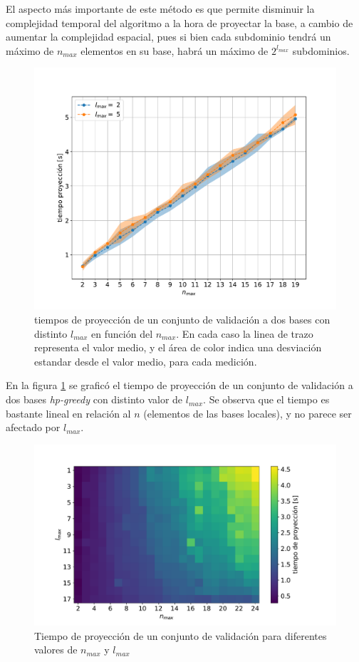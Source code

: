 El aspecto más importante de este método es que permite disminuir la complejidad temporal del algoritmo a la hora de proyectar la base, a cambio de aumentar la complejidad espacial, pues si bien cada subdominio tendrá un máximo de $n_{max}$ elementos en su base, habrá un máximo de $2^{l_{max}}$ subdominios.

\begin{figure}[h!]
\centering
\includegraphics[width=.8\columnwidth ,trim={0, 1cm, 0, 1.2cm}]{figs/t_vs_nmax.pdf}
\caption{tiempos de proyección de un conjunto de validación a dos bases con distinto $l_{max}$ en función del $n_{max}$. En cada caso la linea de trazo representa el valor medio, y el área de color indica una desviación estandar desde el valor medio, para cada medición.}
\label{fig:t_vs_nmax}
\end{figure}


En la figura \ref{fig:t_vs_nmax} se graficó el tiempo de proyección de un conjunto de validación a dos bases \textit{hp-greedy} con distinto valor de $l_{max}$. Se observa que el tiempo es bastante lineal en relación al $n$ (elementos de las bases locales), y no parece ser afectado por $l_{max}$.



\begin{figure}[h!]
\centering
\includegraphics[width=.9\columnwidth, trim={0, 1cm, 0, 1.4cm}]{figs/nmax_lmax_t_grid.pdf}
\caption{Tiempo de proyección de un conjunto de validación para diferentes valores de $n_{max}$ y $l_{max}$}
\label{fig:t_grilla_nl}
\end{figure}


